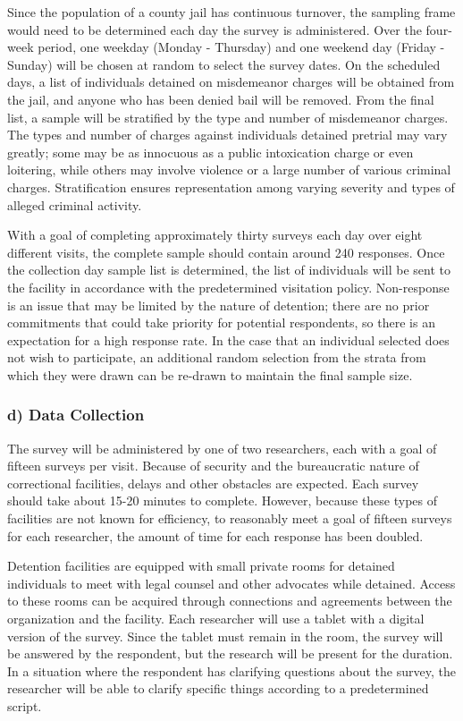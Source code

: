 \documentclass[
  letterpaper,
  DIV=11,
  numbers=noendperiod]{scrartcl}
\begin{document}
Since the population of a county jail has continuous turnover, the
sampling frame would need to be determined each day the survey is
administered. Over the four-week period, one weekday (Monday - Thursday)
and one weekend day (Friday - Sunday) will be chosen at random to select
the survey dates. On the scheduled days, a list of individuals detained
on misdemeanor charges will be obtained from the jail, and anyone who
has been denied bail will be removed. From the final list, a sample will
be stratified by the type and number of misdemeanor charges. The types
and number of charges against individuals detained pretrial may vary
greatly; some may be as innocuous as a public intoxication charge or
even loitering, while others may involve violence or a large number of
various criminal charges. Stratification ensures representation among
varying severity and types of alleged criminal activity.

With a goal of completing approximately thirty surveys each day over
eight different visits, the complete sample should contain around 240
responses. Once the collection day sample list is determined, the list
of individuals will be sent to the facility in accordance with the
predetermined visitation policy. Non-response is an issue that may be
limited by the nature of detention; there are no prior commitments that
could take priority for potential respondents, so there is an
expectation for a high response rate. In the case that an individual
selected does not wish to participate, an additional random selection
from the strata from which they were drawn can be re-drawn to maintain
the final sample size.

\hypertarget{d-data-collection}{%
\subsubsection{d) Data Collection}\label{d-data-collection}}

The survey will be administered by one of two researchers, each with a
goal of fifteen surveys per visit. Because of security and the
bureaucratic nature of correctional facilities, delays and other
obstacles are expected. Each survey should take about 15-20 minutes to
complete. However, because these types of facilities are not known for
efficiency, to reasonably meet a goal of fifteen surveys for each
researcher, the amount of time for each response has been doubled.

Detention facilities are equipped with small private rooms for detained
individuals to meet with legal counsel and other advocates while
detained. Access to these rooms can be acquired through connections and
agreements between the organization and the facility. Each researcher
will use a tablet with a digital version of the survey. Since the tablet
must remain in the room, the survey will be answered by the respondent,
but the research will be present for the duration. In a situation where
the respondent has clarifying questions about the survey, the researcher
will be able to clarify specific things according to a predetermined
script.
\end{document}
